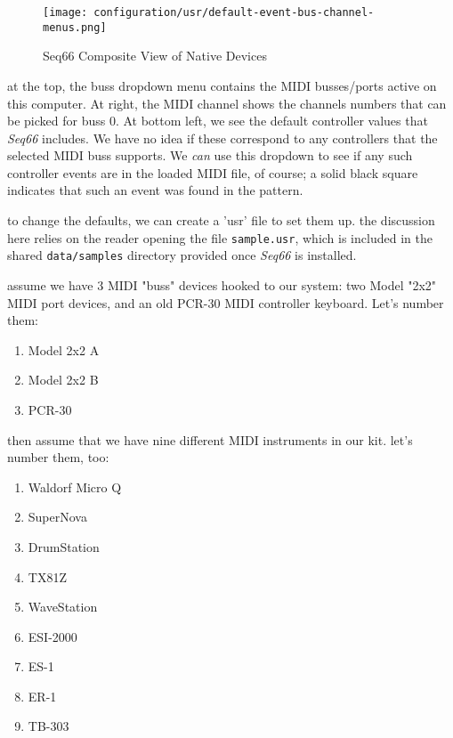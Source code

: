 \begin{figure}[H]
   \centering 
   \texttt{[image: configuration/usr/default-event-bus-channel-menus.png]}
   \caption{Seq66 Composite View of Native Devices}
   \label{fig:default_event_bus_channel_menus}
\end{figure}

   at the top, the buss dropdown menu contains the MIDI busses/ports
   active on this computer.  At right, the MIDI channel shows
   the channels numbers that can be picked for buss 0.  At bottom left, we see
   the default controller values that \textsl{Seq66} includes.  We have
   no idea if these correspond to any controllers that the selected MIDI buss
   supports.  We \textsl{can} use this dropdown to see if any such controller
   events are in the loaded MIDI file, of course; a solid black square
   indicates that such an event was found in the pattern.

   to change the defaults, we can create a 'usr' file to set them up.
   the discussion here relies on the reader opening the file
   \texttt{sample.usr}, which is included in the shared \texttt{data/samples}
   directory provided once \textsl{Seq66} is installed.

   assume we have 3 MIDI "buss" devices hooked to our system:
   two Model "2x2" MIDI port devices, and an old PCR-30 MIDI controller
   keyboard.  Let's number them:

   \begin{enumerate}
      \item Model 2x2 A
      \item Model 2x2 B
      \item PCR-30
   \end{enumerate}

   then assume that we have nine different MIDI instruments in our kit.
   let's number them, too:

   \begin{enumerate}
      \item Waldorf Micro Q
      \item SuperNova
      \item DrumStation
      \item TX81Z
      \item WaveStation
      \item ESI-2000
      \item ES-1
      \item ER-1
      \item TB-303
   \end{enumerate}

